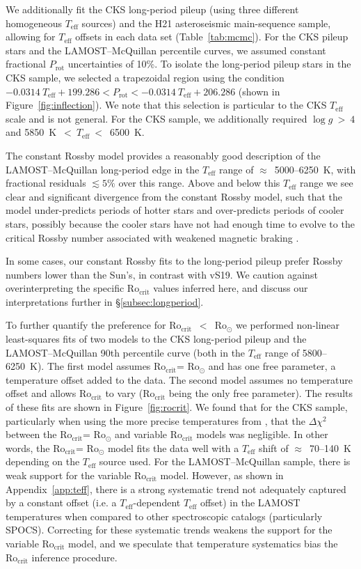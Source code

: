 \documentclass[trackchanges,twocolumn]{aastex631}
\newcommand{\rocrit}{$\mathrm{Ro_{crit}}$\xspace}
\newcommand{\rosun}{$\mathrm{Ro_{\odot}}$\xspace}
\newcommand{\lamostmcq}{LAMOST--McQuillan\xspace}
\newcommand{\jvs}{vS19\xspace}
\newcommand{\hall}{H21\xspace}
\newcommand{\teff}{\ensuremath{T_{\mathrm{eff}}}\xspace}
\newcommand{\logg}{\ensuremath{\log g}\xspace}
\newcommand{\prot}{\ensuremath{P_\mathrm{rot}}\xspace}
\begin{document}
We additionally fit the CKS long-period pileup (using three different homogeneous \teff sources) and the \hall asteroseismic main-sequence sample, allowing for \teff offsets in each data set (Table~\ref{tab:mcmc}). For the CKS pileup stars and the \lamostmcq percentile curves, we assumed constant fractional \prot uncertainties of 10\%. To isolate the long-period pileup stars in the CKS sample, we selected a trapezoidal region using the condition $-0.0314~\teff + 199.286 < \prot < -0.0314~\teff + 206.286$ (shown in Figure~\ref{fig:inflection}). We note that this selection is particular to the CKS \teff scale and is not general. For the CKS sample, we additionally required $\logg~>~4$ and 5850~K~$<~\teff~<$~6500~K. 

The constant Rossby model provides a reasonably good description of the \lamostmcq long-period edge in the \teff range of $\approx$~5000--6250~K, with fractional residuals $\lesssim5\%$ over this range. Above and below this \teff range we see clear and significant divergence from the constant Rossby model, such that the model under-predicts periods of hotter stars and over-predicts periods of cooler stars, possibly because the cooler stars have not had enough time to evolve to the critical Rossby number associated with weakened magnetic braking \citep[see Figure 6 in][]{vanSaders2019}.

In some cases, our constant Rossby fits to the long-period pileup prefer Rossby numbers lower than the Sun's, in contrast with \jvs. We caution against overinterpreting the specific \rocrit values inferred here, and discuss our interpretations further in \S\ref{subsec:longperiod}.

To further quantify the preference for \rocrit~$<$~\rosun we performed non-linear least-squares fits of two models to the CKS long-period pileup and the \lamostmcq 90th percentile curve (both in the \teff range of 5800--6250~K). The first model assumes \rocrit = \rosun and has one free parameter, a temperature offset added to the data. The second model assumes no temperature offset and allows \rocrit to vary (\rocrit being the only free parameter). The results of these fits are shown in Figure~\ref{fig:rocrit}. We found that for the CKS sample, particularly when using the more precise temperatures from \citet{Fulton2018}, that the $\Delta \chi^2$ between the \rocrit = \rosun and variable \rocrit models was negligible. In other words, the \rocrit = \rosun model fits the data well with a \teff shift of $\approx$~70--140~K depending on the \teff source used. For the \lamostmcq sample, there is weak support for the variable \rocrit model. However, as shown in Appendix~\ref{app:teff}, there is a strong systematic trend not adequately captured by a constant offset (i.e. a \teff-dependent \teff offset) in the LAMOST temperatures when compared to other spectroscopic catalogs (particularly SPOCS). Correcting for these systematic trends weakens the support for the variable \rocrit model, and we speculate that temperature systematics bias the \rocrit inference procedure. 
\end{document}
